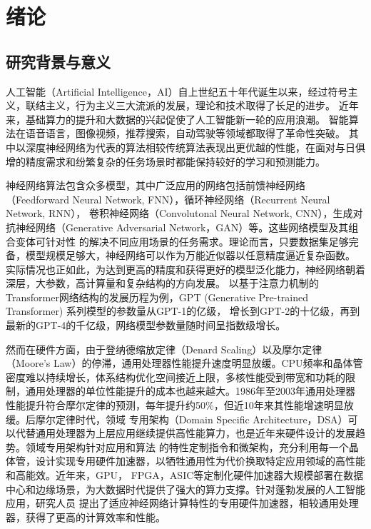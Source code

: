 \chapter{绪\hspace{6pt}论}

\section{研究背景与意义}
人工智能（Artificial Intelligence，AI）自上世纪五十年代诞生以来，经过符号主义，联结主义，行为主义三大流派的发展，理论和技术取得了长足的进步。
近年来，基础算力的提升和大数据的兴起促使了人工智能新一轮的应用浪潮。
智能算法在语音语言，图像视频，推荐搜索，自动驾驶等领域都取得了革命性突破。
其中以深度神经网络为代表的算法相较传统算法表现出更优越的性能，在面对与日俱增的精度需求和纷繁复杂的任务场景时都能保持较好的学习和预测能力。

神经网络算法包含众多模型，其中广泛应用的网络包括前馈神经网络（Feedforward Neural Network, FNN），循环神经网络（Recurrent Neural Network, RNN），
卷积神经网络（Convolutonal Neural Network, CNN），生成对抗神经网络（Generative Adversarial Network，GAN）等。这些网络模型及其组合变体可针对性
的解决不同应用场景的任务需求。理论而言，只要数据集足够完备，模型规模足够大，神经网络可以作为万能近似器以任意精度逼近复杂函数。
实际情况也正如此，为达到更高的精度和获得更好的模型泛化能力，神经网络朝着深层，大参数，高计算量和复杂结构的方向发展。
以基于注意力机制的Transformer网络结构的发展历程为例，GPT (Generative Pre-trained Transformer) 系列模型的参数量从GPT-1的亿级，
增长到GPT-2的十亿级，再到最新的GPT-4的千亿级，网络模型参数量随时间呈指数级增长。

然而在硬件方面，由于登纳德缩放定律（Denard Scaling）以及摩尔定律（Moore's Law）的停滞，通用处理器性能提升速度明显放缓。CPU频率和晶体管
密度难以持续增长，体系结构优化空间接近上限，多核性能受到带宽和功耗的限制，通用处理器的单位性能提升的成本也越来越大。1986年至2003年通用处理器
性能提升符合摩尔定律的预测，每年提升约50\%，但近10年来其性能增速明显放缓。后摩尔定律时代，领域
专用架构（Domain Specific Architecture，DSA）可以代替通用处理器为上层应用继续提供高性能算力，也是近年来硬件设计的发展趋势。领域专用架构针对应用和算法
的特性定制指令和微架构，充分利用每一个晶体管，设计实现专用硬件加速器，以牺牲通用性为代价换取特定应用领域的高性能和高能效。近年来，GPU，
FPGA，ASIC等定制化硬件加速器大规模部署在数据中心和边缘场景，为大数据时代提供了强大的算力支撑。针对蓬勃发展的人工智能应用，研究人员
提出了适应神经网络计算特性的专用硬件加速器，相较通用处理器，获得了更高的计算效率和性能。

